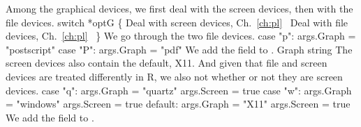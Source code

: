 Among the graphical devices, we first deal with the screen devices,
then with the file devices.
\nwenddocs{}\endmoddef\nwstartdeflinemarkup{}\nwenddeflinemarkup
switch *optG \{
          \LA{}Deal with screen devices, Ch.~\ref{ch:pl}~{\nwtagstyle{}}\RA{}
          \LA{}Deal with file devices, Ch.~\ref{ch:pl}~{\nwtagstyle{}}\RA{}
\}
\nwendcode{}\nwdocspar
We go through the two file devices.
\nwenddocs{}\endmoddef\nwstartdeflinemarkup{}\nwenddeflinemarkup
case "p":
args.Graph = "postscript"
case "P":
args.Graph = "pdf"
\nwendcode{}\nwdocspar
We add the field  to .
\nwenddocs{}\plusendmoddef\nwstartdeflinemarkup{}\nwenddeflinemarkup
Graph string
\nwendcode{}\nwdocspar
The screen devices also contain the default, X11. And given that file
and screen devices are treated differently in R, we also not whether
or not they are screen devices.
\nwenddocs{}\endmoddef\nwstartdeflinemarkup{}\nwenddeflinemarkup
case "q":
args.Graph = "quartz"
args.Screen = true
case "w":
args.Graph = "windows"
args.Screen = true
default:
args.Graph = "X11"
args.Screen = true
\nwendcode{}\nwdocspar
We add the field  to .
\nwenddocs{}\plusendmoddef\nwstartdeflinemarkup{}\nwenddeflinemarkup
